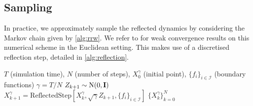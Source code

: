 \subsection{Sampling}
In practice, we approximately sample the reflected dynamics by considering the Markov chain given by \cref{alg:rrw}.
We refer to \textcite{pacchiarotti1998numerical,bossy2004symmetrized} for weak convergence results on this numerical scheme in the Euclidean setting.
This makes use of a discretised reflection step, detailed in \cref{alg:reflection}.

\begin{algorithm}[t]
	\caption[]{\protect{}Discretisation of the stochastic differential equation \(\mathrm{d} \v{X}_t = b(t, \v{X}_t) \mathrm{d} t + \mathrm{d} \v{B}_t - \mathrm{d} \v{k}_t\).
	}
	\label{alg:rrw}
	\begin{algorithmic}
		 \(T\) (simulation time), \(N\) (number of steps), \(X_0^\gamma\) (initial point), \(\{f_i\}_{i \in \mathcal{I}}\) (boundary functions)
		\State \(\gamma = T / N\)
		\State \(Z_{k+1} \sim \mathrm{N}(0, \m{I})\)
		\State \(X_{k+1}^\gamma = \text{ReflectedStep}[X_{k}^\gamma, \sqrt{\gamma}
			Z_{k+1}, \{f_i\}_{i \in \mathcal{I}}]\) 
		\EndFor {} \(\{ X_k^\gamma\}_{k=0}^{N}\) \end{algorithmic} \end{algorithm} 
